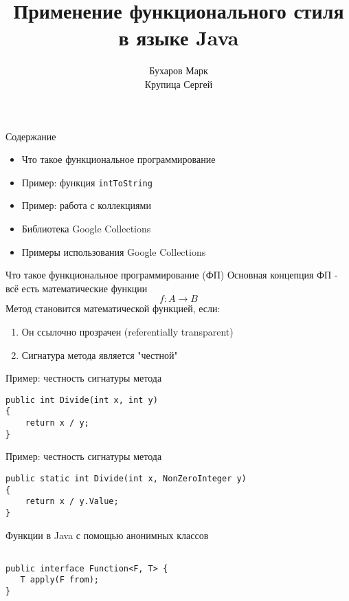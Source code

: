 \documentclass[aspectratio=169]{beamer}
\date{}
\title{Применение функционального стиля в языке Java}
\author{Бухаров Марк \\ Крупица Сергей}
\begin{document}
\begin{frame} 
	\titlepage
\end{frame}

\begin{frame}{Содержание}
	\begin{itemize}
		\item Что такое функциональное программирование
		\item Пример: функция \texttt{intToString}
		\item Пример: работа с коллекциями 
		\item Библиотека Google Collections
		\item Примеры использования Google Collections
	\end{itemize}
\end{frame}

\begin{frame}{Что такое функциональное программирование (ФП)}
	Основная концепция ФП - всё есть математические функции
	\[ f: A \rightarrow B \]
	Метод становится математической функцией, если:
	\begin{enumerate}
		\item Он ссылочно прозрачен (referentially transparent)
		\item Сигнатура метода является "честной"
	\end{enumerate}
\end{frame}

\begin{frame}[fragile]{Пример: честность сигнатуры метода}
	\begin{verbatim}
public int Divide(int x, int y)
{
    return x / y;
}
	\end{verbatim}
\end{frame}

\begin{frame}[fragile]{Пример: честность сигнатуры метода}
	\begin{verbatim}
public static int Divide(int x, NonZeroInteger y)
{
    return x / y.Value;
}
	\end{verbatim}
\end{frame}


\begin{frame}[fragile]{Функции в Java с помощью анонимных классов}
	\begin{verbatim}

public interface Function<F, T> {
   T apply(F from);
}
	\end{verbatim}
\end{frame}
\end{document}
